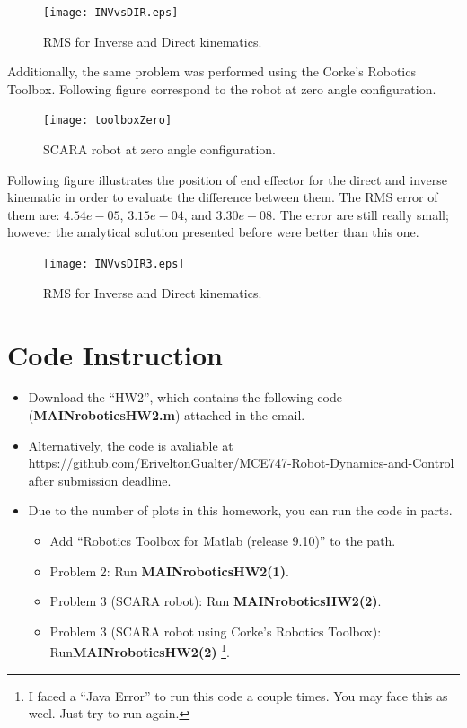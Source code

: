 \documentclass[a4paper,10pt]{article}
\begin{document}
\begin{figure}[H] 
 \centering
 \texttt{[image: INVvsDIR.eps]}
 \caption{RMS for Inverse and Direct kinematics.}\label{fig:invdir}
\end{figure}

Additionally, the same problem was performed using the  Corke’s Robotics Toolbox. Following figure correspond to the robot at zero angle configuration. 

\begin{figure}[H] 
 \centering
 \texttt{[image: toolboxZero]}
 \caption{SCARA robot at zero angle configuration.}\label{toolbox}
\end{figure}

Following figure illustrates the position of end effector for the direct and inverse kinematic in order to evaluate the difference between them. The RMS error of them are: $4.54e-05$, $3.15e-04$, and $3.30e-08$. The error are still really small; however the analytical solution presented before were better than this one.

\begin{figure}[H] 
 \centering
 \texttt{[image: INVvsDIR3.eps]}
 \caption{RMS for Inverse and Direct kinematics.}\label{fig:invdir2}
\end{figure}

\section{Code Instruction}

\begin{itemize}
 \item Download the ``HW2'', which contains the following code (\textbf{MAINroboticsHW2.m}) attached in the email. 
 \item Alternatively, the code is avaliable at \url{https://github.com/EriveltonGualter/MCE747-Robot-Dynamics-and-Control} after submission deadline.
 \item Due to the number of plots in this homework, you can run the code in parts. 
 \begin{itemize}
  \item Add ``Robotics Toolbox for Matlab (release 9.10)'' to the path.
  \item Problem 2: Run \textbf{MAINroboticsHW2(1)}.
  \item Problem 3 (SCARA robot): Run \textbf{MAINroboticsHW2(2)}.
  \item Problem 3 (SCARA robot using Corke's Robotics Toolbox): Run\textbf{MAINroboticsHW2(2)} \footnote{I faced a ``Java Error'' to run this code a couple times. You may face this as weel. Just try to run again.}.
  \end{itemize} 
\end{itemize}
\end{document}
